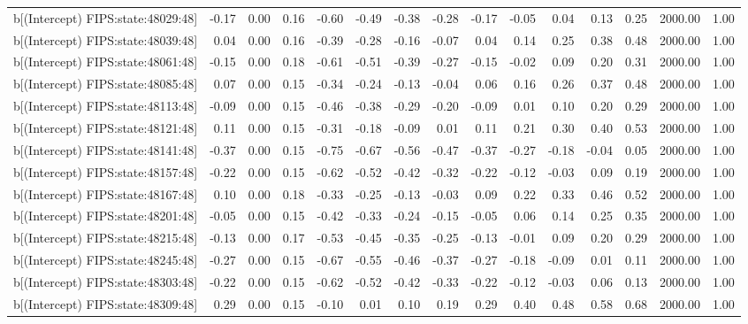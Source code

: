 \begin{table}[ht]
\begin{tabular}{rrrrrrrrrrrrrrr}
  b[(Intercept) FIPS:state:48029:48] & -0.17 & 0.00 & 0.16 & -0.60 & -0.49 & -0.38 & -0.28 & -0.17 & -0.05 & 0.04 & 0.13 & 0.25 & 2000.00 & 1.00 \\ 
  b[(Intercept) FIPS:state:48039:48] & 0.04 & 0.00 & 0.16 & -0.39 & -0.28 & -0.16 & -0.07 & 0.04 & 0.14 & 0.25 & 0.38 & 0.48 & 2000.00 & 1.00 \\ 
  b[(Intercept) FIPS:state:48061:48] & -0.15 & 0.00 & 0.18 & -0.61 & -0.51 & -0.39 & -0.27 & -0.15 & -0.02 & 0.09 & 0.20 & 0.31 & 2000.00 & 1.00 \\ 
  b[(Intercept) FIPS:state:48085:48] & 0.07 & 0.00 & 0.15 & -0.34 & -0.24 & -0.13 & -0.04 & 0.06 & 0.16 & 0.26 & 0.37 & 0.48 & 2000.00 & 1.00 \\ 
  b[(Intercept) FIPS:state:48113:48] & -0.09 & 0.00 & 0.15 & -0.46 & -0.38 & -0.29 & -0.20 & -0.09 & 0.01 & 0.10 & 0.20 & 0.29 & 2000.00 & 1.00 \\ 
  b[(Intercept) FIPS:state:48121:48] & 0.11 & 0.00 & 0.15 & -0.31 & -0.18 & -0.09 & 0.01 & 0.11 & 0.21 & 0.30 & 0.40 & 0.53 & 2000.00 & 1.00 \\ 
  b[(Intercept) FIPS:state:48141:48] & -0.37 & 0.00 & 0.15 & -0.75 & -0.67 & -0.56 & -0.47 & -0.37 & -0.27 & -0.18 & -0.04 & 0.05 & 2000.00 & 1.00 \\ 
  b[(Intercept) FIPS:state:48157:48] & -0.22 & 0.00 & 0.15 & -0.62 & -0.52 & -0.42 & -0.32 & -0.22 & -0.12 & -0.03 & 0.09 & 0.19 & 2000.00 & 1.00 \\ 
  b[(Intercept) FIPS:state:48167:48] & 0.10 & 0.00 & 0.18 & -0.33 & -0.25 & -0.13 & -0.03 & 0.09 & 0.22 & 0.33 & 0.46 & 0.52 & 2000.00 & 1.00 \\ 
  b[(Intercept) FIPS:state:48201:48] & -0.05 & 0.00 & 0.15 & -0.42 & -0.33 & -0.24 & -0.15 & -0.05 & 0.06 & 0.14 & 0.25 & 0.35 & 2000.00 & 1.00 \\ 
  b[(Intercept) FIPS:state:48215:48] & -0.13 & 0.00 & 0.17 & -0.53 & -0.45 & -0.35 & -0.25 & -0.13 & -0.01 & 0.09 & 0.20 & 0.29 & 2000.00 & 1.00 \\ 
  b[(Intercept) FIPS:state:48245:48] & -0.27 & 0.00 & 0.15 & -0.67 & -0.55 & -0.46 & -0.37 & -0.27 & -0.18 & -0.09 & 0.01 & 0.11 & 2000.00 & 1.00 \\ 
  b[(Intercept) FIPS:state:48303:48] & -0.22 & 0.00 & 0.15 & -0.62 & -0.52 & -0.42 & -0.33 & -0.22 & -0.12 & -0.03 & 0.06 & 0.13 & 2000.00 & 1.00 \\ 
  b[(Intercept) FIPS:state:48309:48] & 0.29 & 0.00 & 0.15 & -0.10 & 0.01 & 0.10 & 0.19 & 0.29 & 0.40 & 0.48 & 0.58 & 0.68 & 2000.00 & 1.00 \\ 

\end{tabular}
\end{table}

